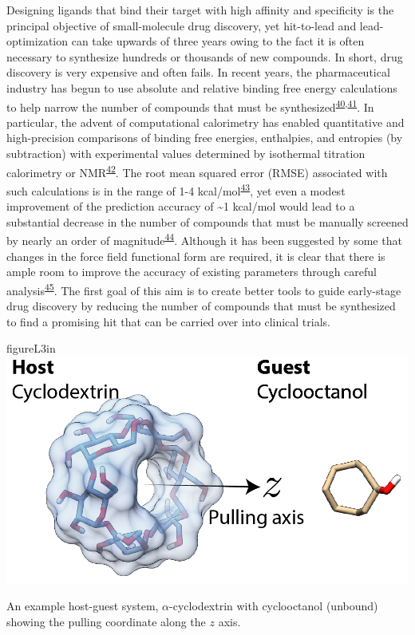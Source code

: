 \documentclass[11pt,notitlepage]{article}
\begin{document}
Designing ligands that bind their target with high affinity and
specificity is the principal objective of small-molecule drug discovery,
yet hit-to-lead and lead-optimization can take upwards of three years
owing to the fact it is often necessary to synthesize hundreds or
thousands of new compounds. In short, drug discovery is very expensive
and often fails. In recent years, the pharmaceutical industry has begun
to use absolute and relative binding free energy calculations to help
narrow the number of compounds that must be
synthesized\textsuperscript{\protect\hyperlink{ref-1FiDpP1LR}{40},\protect\hyperlink{ref-1BwXH3GFO}{41}}.
In particular, the advent of computational calorimetry has enabled
quantitative and high-precision comparisons of binding free energies,
enthalpies, and entropies (by subtraction) with experimental values
determined by isothermal titration calorimetry or
NMR\textsuperscript{\protect\hyperlink{ref-1935a9V0d}{42}}. The root
mean squared error (RMSE) associated with such calculations is in the
range of 1-4
kcal/mol\textsuperscript{\protect\hyperlink{ref-LWd10vQy}{43}}, yet even
a modest improvement of the prediction accuracy of \textasciitilde{}1
kcal/mol would lead to a substantial decrease in the number of compounds
that must be manually screened by nearly an order of
magnitude\textsuperscript{\protect\hyperlink{ref-fC0t6Cy1}{44}}.
Although it has been suggested by some that changes in the force field
functional form are required, it is clear that there is ample room to
improve the accuracy of existing parameters through careful
analysis\textsuperscript{\protect\hyperlink{ref-LOjcxYqt}{45}}. The
first goal of this aim is to create better tools to guide early-stage
drug discovery by reducing the number of compounds that must be
synthesized to find a promising hit that can be carried over into
clinical trials.


\begin{wrapfloat}{figure}{L}{3in}
\centering
\includegraphics{content/images/APR-annotated.png}
\caption{An example host-guest system, \(\alpha\)-cyclodextrin with
cyclooctanol (unbound) showing the pulling coordinate along the \(z\)
axis.}
\label{fig:apr}
\end{wrapfloat}
\end{document}
